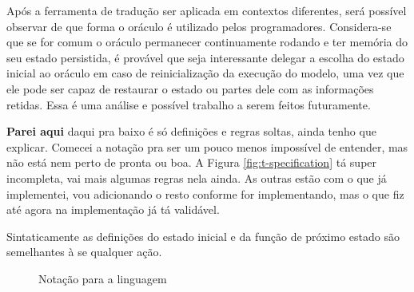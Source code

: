 Após a ferramenta de tradução ser aplicada em contextos diferentes, será
possível observar de que forma o oráculo é utilizado pelos programadores.
Considera-se que se for comum o oráculo permanecer continuamente rodando e ter
memória do seu estado persistida, é provável que seja interessante delegar a
escolha do estado inicial ao oráculo em caso de reinicialização da execução do
modelo, uma vez que ele pode ser capaz de restaurar o estado ou partes dele com
as informações retidas. Essa é uma análise e possível trabalho a serem feitos
futuramente.

\textbf{Parei aqui} daqui pra baixo é só definições e regras soltas, ainda tenho
que explicar. Comecei a notação pra ser um pouco menos impossível de entender,
mas não está nem perto de pronta ou boa. A Figura \ref{fig:t-specification} tá super
incompleta, vai mais algumas regras nela ainda. As outras estão com o que já
implementei, vou adicionando o resto conforme for implementando, mas o que fiz
até agora na implementação já tá validável.

Sintaticamente as definições do estado inicial e da função de próximo estado são
semelhantes à se qualquer ação.
\begin{figure}[h]
  \centering
  \caption{Notação para a linguagem \TLA}
\label{fig:notacao-tla}
\end{figure}

